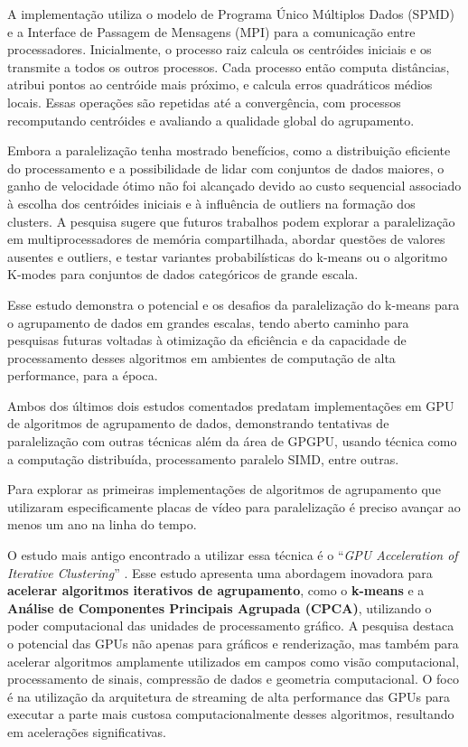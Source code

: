 \documentclass[12pt,
openright, 
oneside, %
a4paper,    %
brazil]{facom-ufu-abntex2}
\begin{document}
A implementação utiliza o modelo de Programa Único Múltiplos Dados (SPMD) e a Interface de Passagem de Mensagens (MPI) para a comunicação entre processadores. Inicialmente, o processo raiz calcula os centróides iniciais e os transmite a todos os outros processos. Cada processo então computa distâncias, atribui pontos ao centróide mais próximo, e calcula erros quadráticos médios locais. Essas operações são repetidas até a convergência, com processos recomputando centróides e avaliando a qualidade global do agrupamento.

Embora a paralelização tenha mostrado benefícios, como a distribuição eficiente do processamento e a possibilidade de lidar com conjuntos de dados maiores, o ganho de velocidade ótimo não foi alcançado devido ao custo sequencial associado à escolha dos centróides iniciais e à influência de outliers na formação dos clusters. A pesquisa sugere que futuros trabalhos podem explorar a paralelização em multiprocessadores de memória compartilhada, abordar questões de valores ausentes e outliers, e testar variantes probabilísticas do k-means ou o algoritmo K-modes para conjuntos de dados categóricos de grande escala.

Esse estudo demonstra o potencial e os desafios da paralelização do k-means para o agrupamento de dados em grandes escalas, tendo aberto caminho para pesquisas futuras voltadas à otimização da eficiência e da capacidade de processamento desses algoritmos em ambientes de computação de alta performance, para a época.

Ambos dos últimos dois estudos comentados predatam implementações em GPU de algoritmos de agrupamento de dados, demonstrando tentativas de paralelização com outras técnicas além da área de GPGPU, usando técnica como a computação distribuída, processamento paralelo SIMD, entre outras.

Para explorar as primeiras implementações de algoritmos de agrupamento que utilizaram especificamente placas de vídeo para paralelização é preciso avançar ao menos um ano na linha do tempo.

O estudo mais antigo encontrado a utilizar essa técnica é o \enquote{\textit{GPU Acceleration of Iterative Clustering}} \cite{iterativeClusteringGPU2004}. Esse estudo apresenta uma abordagem inovadora para \textbf{acelerar algoritmos iterativos de agrupamento}, como o \textbf{k-means} e a \textbf{Análise de Componentes Principais Agrupada (CPCA)}, utilizando o poder computacional das unidades de processamento gráfico. A pesquisa destaca o potencial das GPUs não apenas para gráficos e renderização, mas também para acelerar algoritmos amplamente utilizados em campos como visão computacional, processamento de sinais, compressão de dados e geometria computacional. O foco é na utilização da arquitetura de streaming de alta performance das GPUs para executar a parte mais custosa computacionalmente desses algoritmos, resultando em acelerações significativas.
\end{document}
